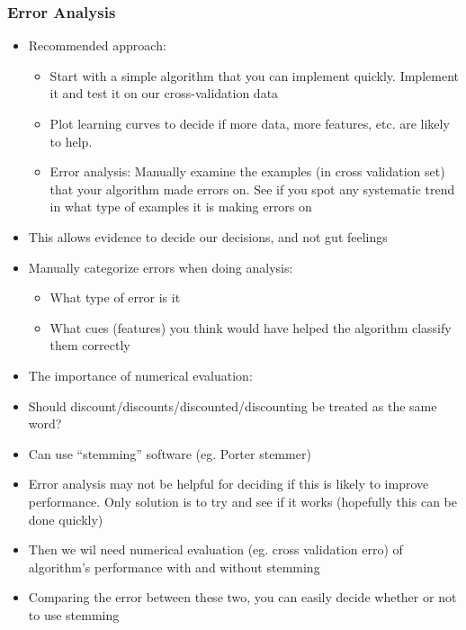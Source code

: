 \subsubsection{Error Analysis}
\begin{itemize}[--]
	\item Recommended approach:
	\begin{itemize}
		\item Start with a simple algorithm that you can implement quickly. Implement it and test it on our cross-validation data
		\item Plot learning curves to decide if more data, more features, etc. are likely to help.
		\item Error analysis: Manually examine the examples (in cross validation set) that your algorithm made errors on. See if you spot any systematic trend in what type of examples it is making errors on
	\end{itemize}

	\item This allows evidence to decide our decisions, and not gut feelings
	\item Manually categorize errors when doing analysis:
	\begin{itemize}[--]
		\item What type of error is it
		\item What cues (features) you think would have helped the algorithm classify them correctly
	\end{itemize}

	\item The importance of numerical evaluation:
	\item Should discount/discounts/discounted/discounting be treated as the same word?
	\item Can use ``stemming'' software (eg. Porter stemmer)
	\item Error analysis may not be helpful for deciding if this is likely to improve performance. Only solution is to try and see if it works (hopefully this can be done quickly)
	\item Then we wil need numerical evaluation (eg. cross validation erro) of algorithm's performance with and without stemming
	\item Comparing the error between these two, you can easily decide whether or not to use stemming
\end{itemize}

